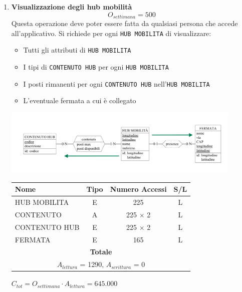 \documentclass[12pt,a4paper]{report}
\begin{document}
\begin{enumerate}[label=\textbf{\arabic*}]
        \item \textbf{Visualizzazione degli hub mobilità} \label{op3} \\
	\[{O_{settimana} = 500}\]
	Questa operazione deve poter essere fatta da qualsiasi persona che accede all'applicativo. Si richiede per ogni \texttt{HUB MOBILITA} di visualizzare:
	\begin{itemize}
	\renewcommand\labelitemi{--}
	    \item Tutti gli attributi di \texttt{HUB MOBILITA}
	    \item I tipi di \texttt{CONTENUTO HUB} per ogni \texttt{HUB MOBILITA}
	    \item I posti rimanenti per ogni \texttt{CONTENUTO HUB} nell'\texttt{HUB MOBILITA}
	    \item L'eventuale fermata a cui è collegato
	\end{itemize}
	\begin{center}
	\includegraphics[width=0.9\textwidth]{VisualHubMobilita}
	\end{center}
    \begin{table}[H]
    \centering
	\begin{tabular}{|l|c|c|c|}
	\hline
	Nome & Tipo & Numero Accessi & S/L \\
	\hline
	HUB MOBILITA & E & 225 & L \\
	\hline
	CONTENUTO & A & 225 $\times$ 2 & L \\
	\hline
	CONTENUTO HUB & E & 225 $\times$ 2 & L \\
	\hline
	FERMATA & E & 165 & L \\
	\hline
        \multicolumn{4}{c}{\textbf{Totale}} \\
        \multicolumn{4}{c}{${A_{lettura}}$ = 1290, ${A_{scrittura}}$ = 0} \\
        \hline
	\end{tabular}
    \end{table}
    \begin{center}
    ${C_{tot} = {O_{settimana}}\cdot{A_{lettura}}= 645.000}$
    \end{center}



\end{enumerate}
\end{document}
